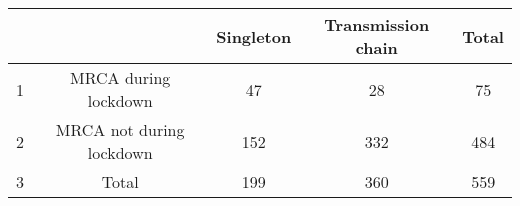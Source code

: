 \begin{tabular}{lcccc}
  \hline
 &  & Singleton & Transmission chain & Total \\ 
  \hline
1 & MRCA during lockdown &  47 &  28 &  75 \\ 
  2 & MRCA not during lockdown & 152 & 332 & 484 \\ 
  3 & Total & 199 & 360 & 559 \\ 
   \hline
\end{tabular}
